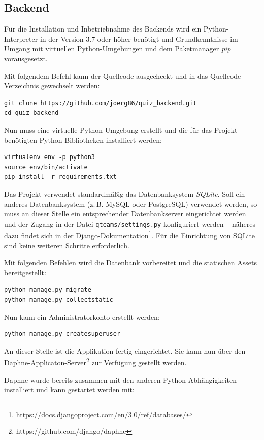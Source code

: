 \documentclass[a4paper,11pt,listof=numbered,glossary=totoc,parskip=half,toc=bib]{scrreprt}
\begin{document}
\begin{appendices}
	\section{Backend}
	Für die Installation und Inbetriebnahme des Backends wird ein Python-Interpreter in der Version 3.7 oder höher benötigt und Grundkenntnisse im Umgang mit virtuellen Python-Umgebungen und dem Paketmanager \textit{pip} vorausgesetzt.
	
	Mit folgendem Befehl kann der Quellcode ausgecheckt und in das Quellcode-Verzeichnis gewechselt werden:		
	\begin{verbatim}
git clone https://github.com/joerg86/quiz_backend.git
cd quiz_backend
	\end{verbatim}
	
	Nun muss eine virtuelle Python-Umgebung erstellt und die für das Projekt benötigten Python-Bibliotheken installiert werden:
	\begin{verbatim}
virtualenv env -p python3
source env/bin/activate
pip install -r requirements.txt
	\end{verbatim}
	
	Das Projekt verwendet standardmäßig das Datenbanksystem \textit{SQLite}. Soll ein anderes Datenbanksystem (z.\,B. MySQL oder PostgreSQL) verwendet werden, so muss an dieser Stelle ein entsprechender Datenbankserver eingerichtet werden und der Zugang in der Datei \texttt{qteams/settings.py} konfiguriert werden -- näheres dazu findet sich in der Django-Dokumentation\footnote{https://docs.djangoproject.com/en/3.0/ref/databases/}. Für die Einrichtung von SQLite sind keine weiteren Schritte erforderlich.
	
	Mit folgenden Befehlen wird die Datenbank vorbereitet und die statischen Assets bereitgestellt:
	
	\begin{verbatim}
python manage.py migrate
python manage.py collectstatic
	\end{verbatim}
	
	Nun kann ein Administratorkonto erstellt werden:
	
	\begin{verbatim}
python manage.py createsuperuser
	\end{verbatim}
	
	An dieser Stelle ist die Applikation fertig eingerichtet. Sie kann nun über den Daphne-Applicaton-Server\footnote{https://github.com/django/daphne} zur Verfügung gestellt werden. 
	
	Daphne wurde bereits zusammen mit den anderen Python-Abhängigkeiten installiert und kann gestartet werden mit:
	

\end{appendices}
\end{document}
